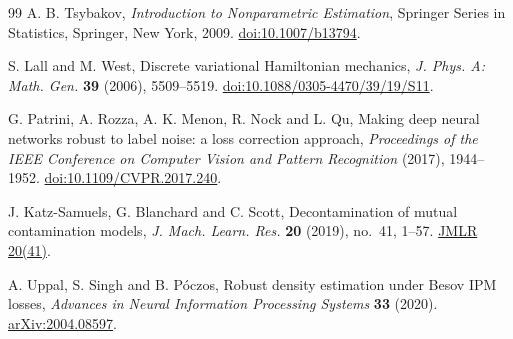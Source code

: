\begin{thebibliography}{99}
A. B. Tsybakov, \emph{Introduction to Nonparametric Estimation},
Springer Series in Statistics, Springer, New York, 2009.
\href{https://doi.org/10.1007/b13794}{doi:10.1007/b13794}.

S. Lall and M. West, Discrete variational Hamiltonian mechanics,
\emph{J. Phys. A: Math. Gen.} \textbf{39} (2006), 5509--5519.
\href{https://doi.org/10.1088/0305-4470/39/19/S11}{doi:10.1088/0305-4470/39/19/S11}.

G. Patrini, A. Rozza, A. K. Menon, R. Nock and L. Qu,
Making deep neural networks robust to label noise: a loss correction approach,
\emph{Proceedings of the IEEE Conference on Computer Vision and Pattern
Recognition} (2017), 1944--1952.
\href{https://doi.org/10.1109/CVPR.2017.240}{doi:10.1109/CVPR.2017.240}.

J. Katz-Samuels, G. Blanchard and C. Scott,
Decontamination of mutual contamination models,
\emph{J. Mach. Learn. Res.} \textbf{20} (2019), no.~41, 1--57.
\href{https://www.jmlr.org/papers/v20/17-576.html}{JMLR 20(41)}.

A. Uppal, S. Singh and B. P\'oczos,
Robust density estimation under Besov IPM losses,
\emph{Advances in Neural Information Processing Systems} \textbf{33} (2020).
\href{https://arxiv.org/abs/2004.08597}{arXiv:2004.08597}.
\end{thebibliography}
